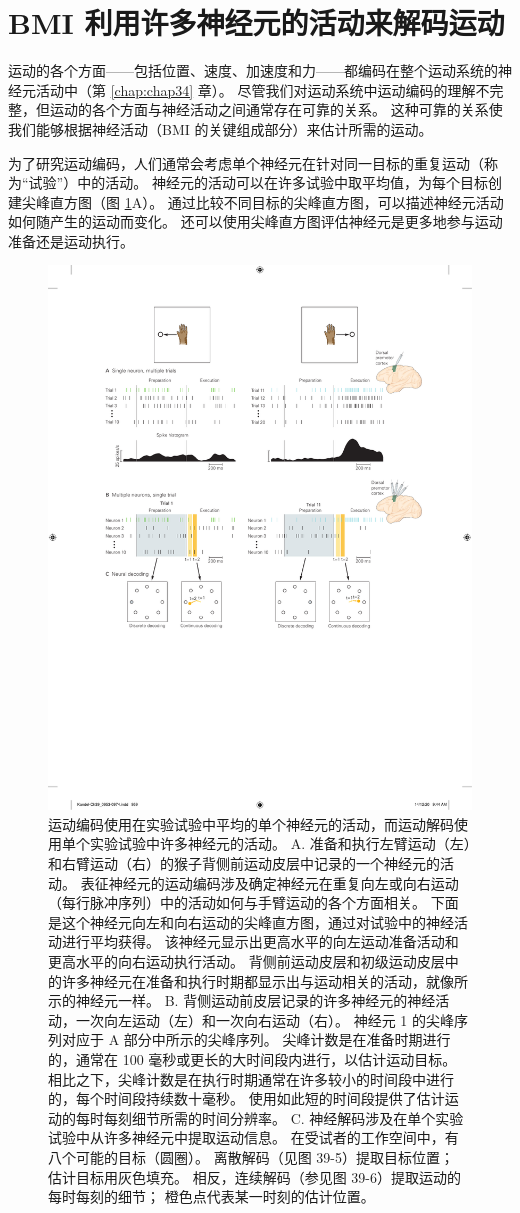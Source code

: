 \section{BMI 利用许多神经元的活动来解码运动}
运动的各个方面——包括位置、速度、加速度和力——都编码在整个运动系统的神经元活动中（第 \ref{chap:chap34} 章）。 
尽管我们对运动系统中运动编码的理解不完整，但运动的各个方面与神经活动之间通常存在可靠的关系。 
这种可靠的关系使我们能够根据神经活动（BMI 的关键组成部分）来估计所需的运动。


为了研究运动编码，人们通常会考虑单个神经元在针对同一目标的重复运动（称为“试验”）中的活动。 
神经元的活动可以在许多试验中取平均值，为每个目标创建尖峰直方图（图 \ref{fig:39_3}A）。 通过比较不同目标的尖峰直方图，可以描述神经元活动如何随产生的运动而变化。 还可以使用尖峰直方图评估神经元是更多地参与运动准备还是运动执行。

\begin{figure}[htbp]
	\centering
	\includegraphics[width=0.5\linewidth]{chap39/fig_39_3}
	\caption{运动编码使用在实验试验中平均的单个神经元的活动，而运动解码使用单个实验试验中许多神经元的活动。 
		A. 准备和执行左臂运动（左）和右臂运动（右）的猴子背侧前运动皮层中记录的一个神经元的活动。 
		表征神经元的运动编码涉及确定神经元在重复向左或向右运动（每行脉冲序列）中的活动如何与手臂运动的各个方面相关。 
		下面是这个神经元向左和向右运动的尖峰直方图，通过对试验中的神经活动进行平均获得。 
		该神经元显示出更高水平的向左运动准备活动和更高水平的向右运动执行活动。 
		背侧前运动皮层和初级运动皮层中的许多神经元在准备和执行时期都显示出与运动相关的活动，就像所示的神经元一样。 
		B. 背侧运动前皮层记录的许多神经元的神经活动，一次向左运动（左）和一次向右运动（右）。 
		神经元 1 的尖峰序列对应于 A 部分中所示的尖峰序列。
		尖峰计数是在准备时期进行的，通常在 100 毫秒或更长的大时间段内进行，以估计运动目标。 
		相比之下，尖峰计数是在执行时期通常在许多较小的时间段中进行的，每个时间段持续数十毫秒。 
		使用如此短的时间段提供了估计运动的每时每刻细节所需的时间分辨率。 
		C. 神经解码涉及在单个实验试验中从许多神经元中提取运动信息。 在受试者的工作空间中，有八个可能的目标（圆圈）。 
		离散解码（见图 39-5）提取目标位置； 估计目标用灰色填充。 
		相反，连续解码（参见图 39-6）提取运动的每时每刻的细节； 橙色点代表某一时刻的估计位置。}
	\label{fig:39_3}
\end{figure}



